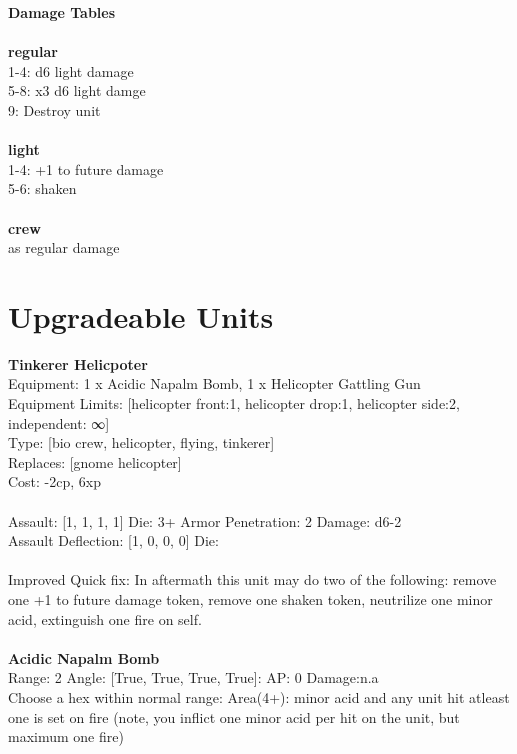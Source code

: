 {\bf Damage Tables} \\
\ \\ {\bf regular } \\
1-4: d6 light damage \\
5-8: x3 d6 light damge \\
9: Destroy unit \\
\ \\ {\bf light } \\
1-4: +1 to future damage \\
5-6: shaken \\
\ \\ {\bf crew } \\
as regular damage \\










\pagebreak\section{Upgradeable Units}{\bf Tinkerer Helicpoter } \\
Equipment: 1 x Acidic Napalm Bomb, 1 x Helicopter Gattling Gun \\
Equipment Limits: [helicopter front:1, helicopter drop:1, helicopter side:2, independent: ∞] \\
Type: [bio crew, helicopter, flying, tinkerer] \\
Replaces: [gnome helicopter] \\
Cost: -2cp, 6xp\\
\ \\
Assault: [1, 1, 1, 1] Die: 3+ Armor Penetration: 2 Damage: d6-2 \\
Assault Deflection: [1, 0, 0, 0] Die: \\
\indent  
\ \\
Improved Quick fix: In aftermath this unit may do two of the following: remove one +1 to future damage token, remove one shaken token, neutrilize one minor acid, extinguish one fire on self.\\ 

\ \\
{\bf Acidic Napalm Bomb } \\



Range: 2  Angle: [True, True, True, True]: AP: 0 Damage:n.a \\
Choose a hex within normal range: Area(4+): minor acid and any unit hit atleast one is set on fire (note, you inflict one minor acid per hit on the unit, but maximum one fire)\\ 




